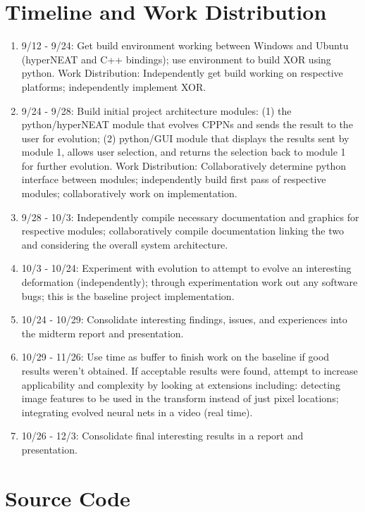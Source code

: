 \documentclass[a4paper,10pt]{article}
\begin{document}
\section{Timeline and Work Distribution}

\begin{enumerate}
    \item 9/12 - 9/24: Get build environment working between Windows and Ubuntu (hyperNEAT and C++ bindings); use environment to build XOR using python.
Work Distribution: Independently get build working on respective platforms; independently implement XOR.
    \item 9/24 - 9/28: Build initial project architecture modules: (1) the python/hyperNEAT module that evolves CPPNs and sends the result to the user for evolution; (2) python/GUI module that displays the results sent by module 1, allows user selection, and returns the selection back to module 1 for further evolution.
Work Distribution: Collaboratively determine python interface between modules; independently build first pass of respective modules; collaboratively work on implementation.
    \item 9/28 - 10/3: Independently compile necessary documentation and graphics for respective modules; collaboratively compile documentation linking the two and considering the overall system architecture.
    \item 10/3 - 10/24: Experiment with evolution to attempt to evolve an interesting deformation (independently); through experimentation work out any software bugs; this is the baseline project implementation.
    \item 10/24 - 10/29: Consolidate interesting findings, issues, and experiences into the midterm report and presentation.
    \item 10/29 - 11/26: Use time as buffer to finish work on the baseline if good results weren’t obtained. If acceptable results were found, attempt to increase applicability and complexity by looking at extensions including: detecting image features to be used in the transform instead of just pixel locations; integrating evolved neural nets in a video (real time).
    \item 10/26 - 12/3: Consolidate final interesting results in a report and presentation.
\end{enumerate}

\section{Source Code}
\label{sec:source}
\end{document}
